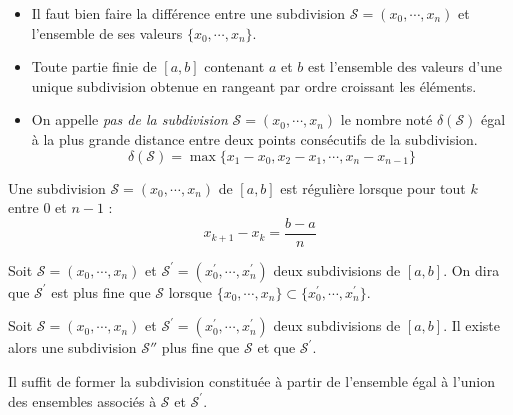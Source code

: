 \begin{rem}
\begin{itemize}
 \item Il faut bien faire la différence entre une subdivision $\mathcal S = (x_0,\cdots,x_n)$ et l'ensemble de ses valeurs $\{x_0,\cdots,x_n\}$.
\item Toute partie finie de $[a,b]$ contenant $a$ et $b$ est l'ensemble des valeurs d'une unique subdivision obtenue en rangeant par ordre croissant les éléments.
\item On appelle \emph{pas de la subdivision} $\mathcal S = (x_0,\cdots,x_n)$ le nombre noté $\delta(\mathcal S)$ égal à la plus grande distance entre deux points consécutifs de la subdivision.
\begin{displaymath}
 \delta(\mathcal S) = \max \{x_{1}-x_0, x_2 -x_1,\cdots , x_n -x_{n-1}\}
\end{displaymath}
\end{itemize}
\end{rem}
\begin{defi}
Une subdivision $\mathcal S = (x_0,\cdots,x_n)$ de $[a,b]$ est régulière lorsque pour tout $k$ entre $0$ et $n-1$ :
\begin{displaymath}
 x_{k+1} - x_k = \dfrac{b-a}{n}
\end{displaymath}
\end{defi}

\begin{defi}
 Soit $\mathcal S = (x_0,\cdots,x_n)$ et $\mathcal S^\prime = (x^\prime_0,\cdots,x^\prime_n)$ deux subdivisions de $[a,b]$. On dira que $\mathcal S^\prime$ est plus fine que $\mathcal S$ lorsque $\{x_0,\cdots,x_n\}\subset \{x^\prime_0,\cdots,x^\prime_n\}$.
\end{defi}

\begin{propn}
 Soit $\mathcal S = (x_0,\cdots,x_n)$ et $\mathcal S^\prime = (x^\prime_0,\cdots,x^\prime_n)$ deux subdivisions de $[a,b]$. Il existe alors une subdivision $\mathcal S''$ plus fine que $\mathcal S$ et que $\mathcal S^\prime$.
\end{propn}
\begin{demo}
 Il suffit de former la subdivision constituée à partir de l'ensemble égal à l'union des ensembles associés à $\mathcal S$ et $\mathcal S^\prime$.
\end{demo}


